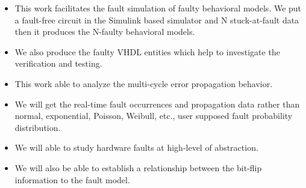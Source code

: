 \begin{itemize}


\item This work facilitates the fault simulation of faulty behavioral models. We put a fault-free circuit in the Simulink based simulator and N stuck-at-fault data then it produces the N-faulty behavioral models.

\item We also produce the faulty VHDL entities which help to investigate the verification and testing.

\item This work able to analyze the multi-cycle error propagation behavior.

\item We will get the real-time fault occurrences and propagation data rather than normal, exponential, Poisson, Weibull, etc., user supposed fault probability distribution.

\item We will able to study hardware faults at high-level of abstraction.

\item We will also be able to establish a relationship between the bit-flip information to the fault model.
\end{itemize}







%
%
%




